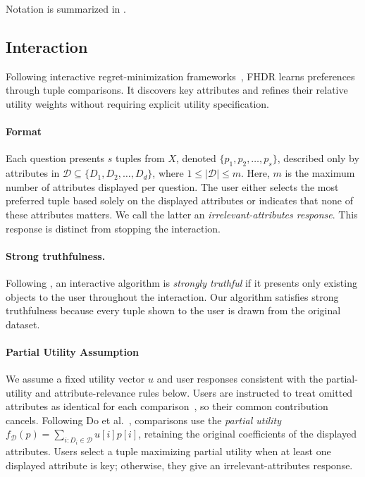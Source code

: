 Notation is summarized in \iftoggle{TechnicalReport}{Section~\ref{appen:summary} of the \technicalreport}{Appendix~\ref{appen:summary}}.

\subsection{Interaction}

Following interactive regret-minimization frameworks~\cite{NL12, XCL19, WWX21, CW23}, FHDR learns preferences through tuple comparisons. It discovers key attributes and refines their relative utility weights without requiring explicit utility specification.

\paragraph{Format}
Each question presents $s$ tuples from $X$, denoted $\{p_1,p_2,\dots,p_s\}$, described only by attributes in $\mathcal{D}\subseteq\{D_1,D_2,\dots,D_d\}$, where $1\leq\lvert\mathcal{D}\rvert\leq m$. Here, $m$ is the maximum number of attributes displayed per question. The user either selects the most preferred tuple based solely on the displayed attributes or indicates that none of these attributes matters. We call the latter an \textit{irrelevant-attributes response}. This response is distinct from stopping the interaction.

\paragraph{Strong truthfulness.}
Following \cite{XCL19}, an interactive algorithm is \emph{strongly truthful} if it presents only existing objects to the user throughout the interaction. Our algorithm satisfies strong truthfulness because every tuple shown to the user is drawn from the original dataset.

\paragraph{Partial Utility Assumption}\label{par}
We assume a fixed utility vector $u$ and user responses consistent with the partial-utility and attribute-relevance rules below. Users are instructed to treat omitted attributes as identical for each comparison~\cite{chan2024vaccine}, so their common contribution cancels. Following Do et al.~\cite{LA25}, comparisons use the \textit{partial utility} $f_\mathcal{D}(p)=\sum_{i:D_i\in\mathcal{D}}u[i]p[i]$, retaining the original coefficients of the displayed attributes. Users select a tuple maximizing partial utility when at least one displayed attribute is key; otherwise, they give an irrelevant-attributes response.

